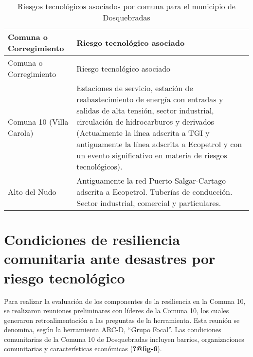 \documentclass[
  letterpaper,
]{book}
\begin{document}
\begin{longtable}[]{@{}
  >{\raggedright\arraybackslash}p{}
  >{\raggedright\arraybackslash}p{}@{}}
\caption{Riesgos tecnológicos asociados por comuna para el municipio de
Dosquebradas}\label{tbl-2}\tabularnewline
\toprule\noalign{}
\begin{minipage}[b]{\linewidth}\raggedright
Comuna o Corregimiento
\end{minipage} & \begin{minipage}[b]{\linewidth}\raggedright
Riesgo tecnológico asociado
\end{minipage} \\
\midrule\noalign{}
\endfirsthead
\toprule\noalign{}
\begin{minipage}[b]{\linewidth}\raggedright
Comuna o Corregimiento
\end{minipage} & \begin{minipage}[b]{\linewidth}\raggedright
Riesgo tecnológico asociado
\end{minipage} \\
\midrule\noalign{}
\endhead
\bottomrule\noalign{}
\endlastfoot
Comuna 10 (Villa Carola) & Estaciones de servicio, estación de
reabastecimiento de energía con entradas y salidas de alta tensión,
sector industrial, circulación de hidrocarburos y derivados (Actualmente
la línea adscrita a TGI y antiguamente la línea adscrita a Ecopetrol y
con un evento significativo en materia de riesgos tecnológicos). \\
Alto del Nudo & Antiguamente la red Puerto Salgar-Cartago adscrita a
Ecopetrol. Tuberías de conducción. Sector industrial, comercial y
particulares. \\
\end{longtable}

\section{Condiciones de resiliencia comunitaria ante desastres por
riesgo
tecnológico}\label{condiciones-de-resiliencia-comunitaria-ante-desastres-por-riesgo-tecnoluxf3gico}

Para realizar la evaluación de los componentes de la resiliencia en la
Comuna 10, se realizaron reuniones preliminares con líderes de la Comuna
10, los cuales generaron retroalimentación a las preguntas de la
herramienta. Esta reunión se denomina, según la herramienta ARC-D,
``Grupo Focal''. Las condiciones comunitarias de la Comuna 10 de
Dosquebradas incluyen barrios, organizaciones comunitarias y
características económicas (\textbf{?@fig-6}).
\end{document}
